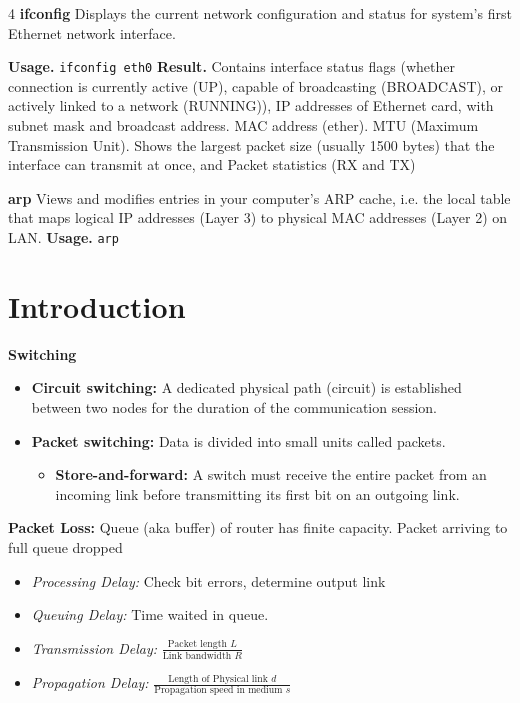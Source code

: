 \documentclass[10pt]{extarticle}
\begin{document}
\begin{multicols}{4}
  \textbf{ifconfig}
  Displays the current network configuration and status for system's first Ethernet network interface.

  \textbf{Usage.} \texttt{ifconfig eth0}
  \textbf{Result.} Contains interface status flags (whether connection is currently active (UP), capable of broadcasting (BROADCAST), or actively linked to a network (RUNNING)), IP addresses of Ethernet card, with subnet mask and broadcast address. MAC address (ether).  MTU (Maximum Transmission Unit). Shows the largest packet size (usually 1500 bytes) that the interface can transmit at once, and Packet statistics (RX and TX)

  \textbf{arp}
  Views and modifies entries in your computer's ARP cache, i.e. the local table that maps logical IP addresses (Layer 3) to physical MAC addresses (Layer 2) on LAN.
  \textbf{Usage.} \texttt{arp}

  \section*{Introduction}
  \textbf{Switching}
  \begin{itemize}
    \item \textbf{Circuit switching:} A dedicated physical path (circuit) is
      established between two nodes for the duration of the communication
      session.
    \item \textbf{Packet switching:} Data is divided into small units called
      packets.
      \begin{itemize}
        \item \textbf{Store-and-forward:} A switch must receive the entire
          packet from an incoming link before transmitting its first bit on an
          outgoing link.
      \end{itemize}
  \end{itemize}

  \textbf{Packet Loss: } Queue (aka buffer) of router has finite capacity. Packet arriving to full queue dropped

  \begin{itemize}
    \item \textit{Processing Delay: } Check bit errors, determine output link
    \item \textit{Queuing Delay: } Time waited in queue.
    \item \textit{Transmission Delay: } $\tfrac{\text{Packet length } L}{\text{Link bandwidth } R}$
    \item \textit{Propagation Delay: } $\tfrac{\text{Length of Physical link } d}{\text{Propagation speed in medium } s}$
  \end{itemize}


\end{multicols}
\end{document}

